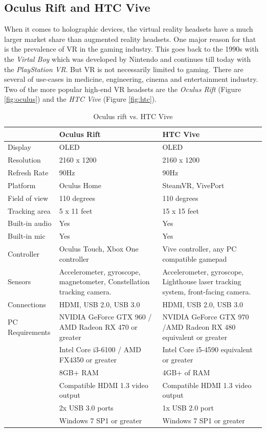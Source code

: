 \documentclass[11pt, a4paper]{IEEEtran}
\begin{document}
\newpage


\subsection{Oculus Rift and HTC Vive}\label{subsec:riftvive}
When it comes to holographic devices, the virtual reality headsets have a much larger market share than augmented reality headsets. One major reason for that is the prevalence of VR in the gaming industry. This goes back to the 1990s with the \textit{Virtal Boy} which was developed by Nintendo and continues till today with the \textit{PlayStation VR}.
But VR is not necessarily limited to gaming. There are several of use-cases in medicine, engineering, cinema and entertainment industry. Two of the more popular high-end VR headsets are the \textit{Oculus Rift} (Figure \ref{fig:oculus}) and the \textit{HTC Vive} (Figure \ref{fig:htc}).


\begin{table}[t]
\normalsize
\caption{Oculus rift vs. HTC Vive}
\centering
\begin{tabular}{p{0.20\linewidth}p{0.40\linewidth}p{0.40\linewidth}}
 & Oculus Rift & HTC Vive\\
 \hline
Display	& OLED & OLED\\
\hline
Resolution & 2160 x 1200 & 2160 x 1200\\
\hline
Refresh Rate & 90Hz & 90Hz\\
\hline
Platform & Oculus Home & SteamVR, VivePort\\
\hline
Field of view & 110 degrees & 110 degrees\\
\hline
Tracking area & 5 x 11 feet & 15 x 15 feet\\
\hline
Built-in audio & Yes & Yes\\
\hline
Built-in mic & Yes & Yes\\
\hline
Controller & Oculus Touch, Xbox One controller & Vive controller, any PC compatible gamepad\\
\hline
Sensors & Accelerometer, gyroscope, magnetometer, Constellation tracking camera. & Accelerometer, gyroscope, Lighthouse laser tracking system, front-facing camera.\\
\hline
Connections & HDMI, USB 2.0, USB 3.0 & HDMI, USB 2.0, USB 3.0\\
\hline
PC Requirements & NVIDIA GeForce GTX 960 / AMD Radeon RX 470 or greater & NVIDIA GeForce GTX 970 /AMD Radeon RX 480 equivalent or greater\\
& Intel Core i3-6100 / AMD FX4350 or greater & Intel Core i5-4590 equivalent or greater\\
& 8GB+ RAM & 4GB+ of RAM\\
& Compatible HDMI 1.3 video output & Compatible HDMI 1.3 video output\\
& 2x USB 3.0 ports & 1x USB 2.0 port\\
& Windows 7 SP1 or greater & Windows 7 SP1 or greater\\

\end{tabular}

\end{table}
\end{document}
